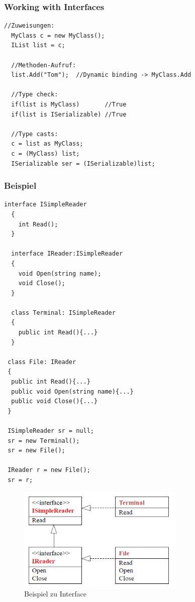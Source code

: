 \subsubsection{Working with Interfaces}
\begin{lstlisting}[style=Csharp]
  //Zuweisungen: 
  MyClass c = new MyClass(); 
  IList list = c; 
  
  //Methoden-Aufruf:
  list.Add("Tom");  //Dynamic binding -> MyClass.Add
  
  //Type check:
  if(list is MyClass)       //True
  if(list is ISerializable) //True
  
  //Type casts: 
  c = list as MyClass; 
  c = (MyClass) list; 
  ISerializable ser = (ISerializable)list;
\end{lstlisting}

\subsubsection{Beispiel}
\begin{lstlisting}[style=Csharp]
  interface ISimpleReader
  {
    int Read();  
  }
  
  interface IReader:ISimpleReader
  {
    void Open(string name); 
    void Close(); 
  }
  
  class Terminal: ISimpleReader
  {
    public int Read(){...}
  }
 
 class File: IReader
 {
  public int Read(){...}
  public void Open(string name){...}
  public void Close(){...}
 }
 
 ISimpleReader sr = null; 
 sr = new Terminal(); 
 sr = new File(); 
 
 IReader r = new File(); 
 sr = r; 
\end{lstlisting}
\begin{figure}[h]
  \centering
  \includegraphics[height=5cm, ]{images/CSharp/InterfaceExample}
  \caption{Beispiel zu Interface} 
\end{figure}

